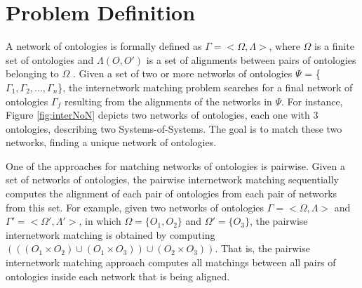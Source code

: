 \documentclass{llncs}
\begin{document}
\section{Problem Definition} \label{subsec:motivationRelevance}

A network of ontologies is formally defined as $\Gamma = < \Omega, \Lambda >$, where $\Omega$ is a finite set of ontologies and $\Lambda(O, O')$ is a set of alignments between pairs of ontologies belonging to $\Omega$ \cite{euzenat2015a}. Given a set of two or more networks of ontologies $\Psi$ = \{$\Gamma_1, \Gamma_2,..., \Gamma_n$\}, the internetwork matching problem searches for a final network of ontologies $\Gamma_f$ resulting from the alignments of the networks in $\Psi$. For instance, Figure \ref{fig:interNoN} depicts two networks of ontologies, each one with 3 ontologies, describing two Systems-of-Systems. The goal is to match these two networks, finding  a unique network of ontologies.

One of the approaches for matching networks of ontologies is pairwise. Given a set of networks of ontologies, the pairwise internetwork matching sequentially computes the alignment of each pair of ontologies from each pair of networks from this set. For example, given two networks of ontologies $\Gamma = < \Omega, \Lambda >$ and $\Gamma' = < \Omega', \Lambda' >$, in which $\Omega = \{O_1, O_2\}$ and $\Omega' = \{O_3\}$, the pairwise internetwork matching is obtained by computing $(((O_{1} \times O_{2}) \cup (O_{1} \times O_{3})) \cup (O_{2} \times O_{3}))$. That is, the pairwise internetwork matching approach computes all matchings between all pairs of ontologies inside each network that is being aligned.  
\end{document}
